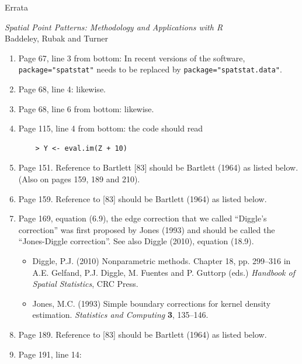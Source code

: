 \documentclass[12pt,a4paper]{article}
\begin{document}
\thispagestyle{empty}
\begin{center}
  \begin{LARGE}
    Errata 
  \end{LARGE}

  \begin{large}
    \emph{Spatial Point Patterns: Methodology and Applications with R}\\
    Baddeley, Rubak and Turner
  \end{large}
\end{center}

\begin{enumerate}
\item Page 67, line 3 from bottom: In recent versions of the software,
  \texttt{package="spatstat"} needs to be replaced by
  \texttt{package="spatstat.data"}.
\item Page 68, line 4: likewise.
\item Page 68, line 6 from bottom: likewise.
\item Page 115, line 4 from bottom: the code should read
\begin{verbatim}
    > Y <- eval.im(Z + 10)
\end{verbatim}
\item Page 151. Reference to Bartlett [83] should be Bartlett (1964)
  as listed below. (Also on pages 159, 189 and 210).
\item Page 159. Reference to [83] should be Bartlett (1964)
  as listed below.
\item Page 169, equation (6.9), the edge correction that we called
  ``Diggle's correction'' was first proposed by Jones (1993)
  and should be called the ``Jones-Diggle correction''.
  See also Diggle (2010), equation (18.9).
\begin{small}
  \begin{itemize}
  \item
    Diggle, P.J. (2010)
    Nonparametric methods.
    Chapter 18, pp. 299--316 in
    A.E. Gelfand, P.J. Diggle, M. Fuentes and P. Guttorp (eds.)
    \emph{Handbook of Spatial Statistics}, CRC Press.
  \item  Jones, M.C. (1993)
    Simple boundary corrections for kernel density estimation.
    \emph{Statistics and Computing} \textbf{3}, 135--146.
  \end{itemize}
\end{small}
\item Page 189. Reference to [83] should be Bartlett (1964)
  as listed below.
\item Page 191, line 14: 

\end{enumerate}
\end{document}
